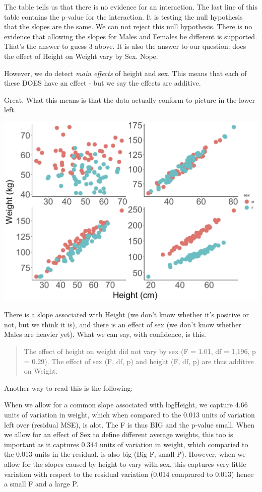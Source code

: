 \documentclass[
]{book}
\begin{document}
The table tells us that there is no evidence for an interaction. The last line of this table contains the p-value for the interaction. It is testing the null hypothesis that the slopes are the same. We can not reject this null hypothesis. There is no evidence that allowing the slopes for Males and Females be different is supported. That's the answer to guess 3 above. It is also the answer to our question: does the effect of Height on Weight vary by Sex. Nope.

However, we do detect \emph{main effects} of height and sex. This means that each of these DOES have an effect - but we say the effects are additive.

Great. What this means is that the data actually conform to picture in the lower left.

\includegraphics[width=17.89in]{images/ANCOVA_1}

There is a slope associated with Height (we don't know whether it's positive or not, but we think it is), and there is an effect of sex (we don't know whether Males are heavier yet). What we can say, with confidence, is this.

\begin{quote}
The effect of height on weight did not vary by sex (F = 1.01, df = 1,196, p = 0.29). The effect of sex (F, df, p) and height (F, df, p) are thus additive on Weight.
\end{quote}

Another way to read this is the following:

When we allow for a common slope associated with logHeight, we capture 4.66 units of variation in weight, which when compared to the 0.013 units of variation left over (residual MSE), is alot. The F is thus BIG and the p-value small. When we allow for an effect of Sex to define different average weights, this too is important as it captures 0.344 units of variation in weight, which comparied to the 0.013 units in the residual, is also big (Big F, small P). However, when we allow for the slopes caused by height to vary with sex, this captures very little variation with respect to the residual variation (0.014 comprared to 0.013) hence a small F and a large P.
\end{document}
